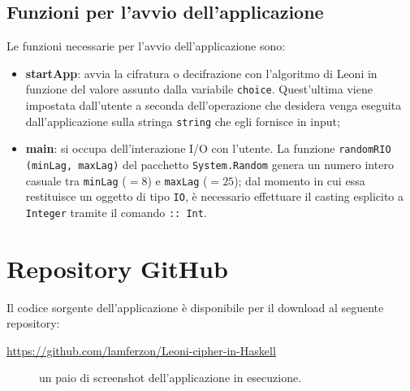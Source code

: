 \documentclass[a4paper, 12pt, one column, aas_macros]{article}
\begin{document}
	\subsection{Funzioni per l'avvio dell'applicazione}
	Le funzioni necessarie per l'avvio dell'applicazione sono:
	\begin{itemize}
		\item \textbf{startApp}: avvia la cifratura o decifrazione con l'algoritmo di Leoni in funzione del valore assunto dalla variabile \verb|choice|. Quest'ultima viene impostata dall'utente a seconda dell'operazione che desidera venga eseguita dall'applicazione sulla stringa \verb|string| che egli fornisce in input;
	
		\item \textbf{main}: si occupa dell'interazione I/O con l'utente. La funzione \verb|randomRIO (minLag, maxLag)| del pacchetto \verb|System.Random| genera un numero intero casuale tra \verb|minLag| ($=8$) e \verb|maxLag| ($=25$); dal momento in cui essa restituisce un oggetto di tipo \verb|IO|, è necessario effettuare il casting esplicito a \verb|Integer| tramite il comando \verb|:: Int|.
	\end{itemize}

	\section{Repository GitHub}
	Il codice sorgente dell'applicazione è disponibile per il download al seguente repository:
	\begin{center}
		\url{https://github.com/lamferzon/Leoni-cipher-in-Haskell}
	\end{center}
	
	\begin{figure}[h!]
		\centering
		\caption[]{un paio di screenshot dell'applicazione in esecuzione.}
		\label{App_screens}
	\end{figure}
\end{document}
